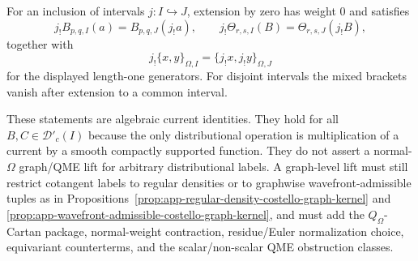 \begin{thm}
  For an inclusion of intervals \(j:I\hookrightarrow J\), extension by zero
  has weight \(0\) and satisfies
  \[
    j_!B_{p,q,I}(a)=B_{p,q,J}(j_!a),\qquad
    j_!\Theta_{r,s,I}(B)=\Theta_{r,s,J}(j_!B),
  \]
  together with
  \[
    j_!\{x,y\}_{\Omega,I}
      =
    \{j_!x,j_!y\}_{\Omega,J}
  \]
  for the displayed length-one generators.  For disjoint intervals the
  mixed brackets vanish after extension to a common interval.

  These statements are algebraic current identities.  They hold for all
  \(B,C\in\mathcal D'_c(I)\) because the only distributional operation is
  multiplication of a current by a smooth compactly supported function.
  They do not assert a normal-\(\Omega\) graph/QME lift for
  arbitrary distributional labels.  A graph-level lift must still restrict
  cotangent labels to regular densities or to graphwise
  wavefront-admissible tuples as in
  Propositions~\ref{prop:app-regular-density-costello-graph-kernel} and
  \ref{prop:app-wavefront-admissible-costello-graph-kernel}, and must add
  the \(Q_\Omega\)-Cartan package, normal-weight contraction,
  residue/Euler normalization choice, equivariant counterterms, and the
  scalar/non-scalar QME obstruction classes.
\end{thm}

